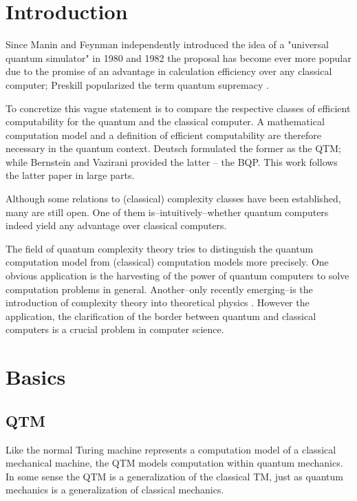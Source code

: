 \section{Introduction}
\label{Introduction}

Since Manin \cite{manin_1980} and Feynman \cite{feynman_1982} independently introduced the idea of a "universal quantum simulator" in 1980 and 1982 the proposal has become ever more popular due to the promise of an advantage in calculation efficiency over any classical computer; Preskill popularized the term quantum supremacy \cite{preskill_2012}.

To concretize this vague statement is to compare the respective classes of efficient computability for the quantum and the classical computer.
A mathematical computation model and a definition of efficient computability are therefore necessary in the quantum context.
Deutsch formulated the former \cite{deutsch_1985} as the \acl{QTM}; while Bernstein and Vazirani provided the latter \cite{bernstein_vazirani_1997} -- the \ac{BQP}.
This work follows the latter paper in large parts.

Although some relations to (classical) complexity classes have been established, many are still open.
One of them is--intuitively--whether quantum computers indeed yield any advantage over classical computers.

The field of quantum complexity theory tries to distinguish the quantum computation model from (classical) computation models more precisely.
One obvious application is the harvesting of the power of quantum computers to solve computation problems in general.
Another--only recently emerging--is the introduction of complexity theory into theoretical physics \cite{susskind_2016}.
However the application, the clarification of the border between quantum and classical computers is a crucial problem in computer science.

\section{Basics}

\subsection{\acl{QTM}}

Like the normal Turing machine represents a computation model of a classical mechanical machine, the \acl{QTM} models computation within quantum mechanics.
In some sense the \ac{QTM} is a generalization of the classical \ac{TM}, just as quantum mechanics is a generalization of classical mechanics.

